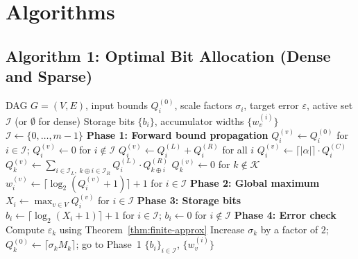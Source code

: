 \documentclass[11pt,a4paper]{article}
\theoremstyle{definition}
\theoremstyle{plain}
\theoremstyle{remark}
\begin{document}
\section{Algorithms}
\label{sec:algo}

\subsection{Algorithm 1: Optimal Bit Allocation (Dense and Sparse)}

\begin{algorithm}[H]
\caption{Optimal Bit Allocation for L-Rep (Dense and Sparse)}
\label{alg:bitalloc}
\begin{algorithmic}[1]
\REQUIRE DAG $G=(V,E)$, input bounds $Q_i^{(0)}$, scale factors $\sigma_i$,
         target error $\varepsilon$, active set $\mathcal{I}$ (or $\emptyset$ for dense)
\ENSURE Storage bits $\{b_i\}$, accumulator widths $\{w_v^{(i)}\}$
 $\mathcal{I} \leftarrow \{0,\ldots,m-1\}$ \ENDIF
\STATE \textbf{Phase 1: Forward bound propagation}
    \STATE $Q_i^{(v)} \leftarrow Q_i^{(0)}$ for $i \in \mathcal{I}$;
           $Q_i^{(v)} \leftarrow 0$ for $i \notin \mathcal{I}$
    \STATE $Q_i^{(v)} \leftarrow Q_i^{(L)} + Q_i^{(R)}$ for all $i$
    \STATE $Q_i^{(v)} \leftarrow \lceil|\alpha|\rceil\cdot Q_i^{(C)}$
      \STATE $Q_k^{(v)} \leftarrow \sum_{i \in \mathcal{I}_L,\; k\oplus i \in \mathcal{I}_R}
               Q_i^{(L)} \cdot Q_{k\oplus i}^{(R)}$
    \ENDFOR
    \STATE $Q_k^{(v)} \leftarrow 0$ for $k \notin \mathcal{K}$
  \ENDIF
  \STATE $w_i^{(v)} \leftarrow \lceil\log_2(Q_i^{(v)}+1)\rceil + 1$ for $i \in \mathcal{I}$
\ENDFOR
\STATE \textbf{Phase 2: Global maximum}
\STATE $X_i \leftarrow \max_{v\in V} Q_i^{(v)}$ for $i \in \mathcal{I}$
\STATE \textbf{Phase 3: Storage bits}
\STATE $b_i \leftarrow \lceil\log_2(X_i+1)\rceil + 1$ for $i \in \mathcal{I}$;
       $b_i \leftarrow 0$ for $i \notin \mathcal{I}$
\STATE \textbf{Phase 4: Error check}
\STATE Compute $\varepsilon_k$ using Theorem~\ref{thm:finite-approx}
  \STATE Increase $\sigma_k$ by a factor of $2$;
         $Q_k^{(0)} \leftarrow \lceil\sigma_k M_k\rceil$;
         go to Phase~1
\ENDIF
\RETURN $\{b_i\}_{i \in \mathcal{I}}$, $\{w_v^{(i)}\}$
\end{algorithmic}
\end{algorithm}
\end{document}
